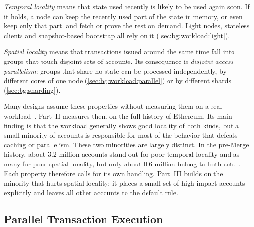 \emph{Temporal locality} means that state used recently is likely to be used again soon.
If it holds, a node can keep the recently used part of the state in memory, or even keep only that part, and fetch or prove the rest on demand.
Light nodes, stateless clients and snapshot-based bootstrap all rely on it (\autoref{sec:bg:workload:light}).

\emph{Spatial locality} means that transactions issued around the same time fall into groups that touch disjoint sets of accounts.
Its consequence is \emph{disjoint access parallelism}: groups that share no state can be processed independently, by different cores of one node (\autoref{sec:bg:workload:parallel}) or by different shards (\autoref{sec:bg:sharding}).

Many designs assume these properties without measuring them on a real workload~\cite{pigaglio2023exploring}.
Part~II measures them on the full history of Ethereum.
Its main finding is that the workload generally shows good locality of both kinds, but a small minority of accounts is responsible for most of the behavior that defeats caching or parallelism.
These two minorities are largely distinct.
In the pre-Merge history, about 3.2 million accounts stand out for poor temporal locality and as many for poor spatial locality, but only about 0.6 million belong to both sets~\cite{pigaglio2023exploring}. 
Each property therefore calls for its own handling.
Part~III builds on the minority that hurts spatial locality: it places a small set of high-impact accounts explicitly and leaves all other accounts to the default rule.

\subsection{Parallel Transaction Execution}\label{sec:bg:workload:parallel}



